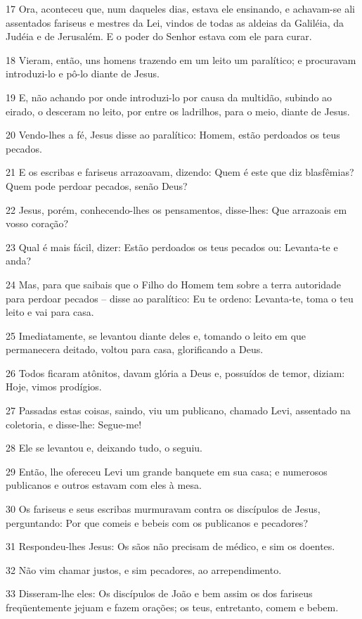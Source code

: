 \par 17 Ora, aconteceu que, num daqueles dias, estava ele ensinando, e achavam-se ali assentados fariseus e mestres da Lei, vindos de todas as aldeias da Galiléia, da Judéia e de Jerusalém. E o poder do Senhor estava com ele para curar.
\par 18 Vieram, então, uns homens trazendo em um leito um paralítico; e procuravam introduzi-lo e pô-lo diante de Jesus.
\par 19 E, não achando por onde introduzi-lo por causa da multidão, subindo ao eirado, o desceram no leito, por entre os ladrilhos, para o meio, diante de Jesus.
\par 20 Vendo-lhes a fé, Jesus disse ao paralítico: Homem, estão perdoados os teus pecados.
\par 21 E os escribas e fariseus arrazoavam, dizendo: Quem é este que diz blasfêmias? Quem pode perdoar pecados, senão Deus?
\par 22 Jesus, porém, conhecendo-lhes os pensamentos, disse-lhes: Que arrazoais em vosso coração?
\par 23 Qual é mais fácil, dizer: Estão perdoados os teus pecados ou: Levanta-te e anda?
\par 24 Mas, para que saibais que o Filho do Homem tem sobre a terra autoridade para perdoar pecados -- disse ao paralítico: Eu te ordeno: Levanta-te, toma o teu leito e vai para casa.
\par 25 Imediatamente, se levantou diante deles e, tomando o leito em que permanecera deitado, voltou para casa, glorificando a Deus.
\par 26 Todos ficaram atônitos, davam glória a Deus e, possuídos de temor, diziam: Hoje, vimos prodígios.
\par 27 Passadas estas coisas, saindo, viu um publicano, chamado Levi, assentado na coletoria, e disse-lhe: Segue-me!
\par 28 Ele se levantou e, deixando tudo, o seguiu.
\par 29 Então, lhe ofereceu Levi um grande banquete em sua casa; e numerosos publicanos e outros estavam com eles à mesa.
\par 30 Os fariseus e seus escribas murmuravam contra os discípulos de Jesus, perguntando: Por que comeis e bebeis com os publicanos e pecadores?
\par 31 Respondeu-lhes Jesus: Os sãos não precisam de médico, e sim os doentes.
\par 32 Não vim chamar justos, e sim pecadores, ao arrependimento.
\par 33 Disseram-lhe eles: Os discípulos de João e bem assim os dos fariseus freqüentemente jejuam e fazem orações; os teus, entretanto, comem e bebem.
